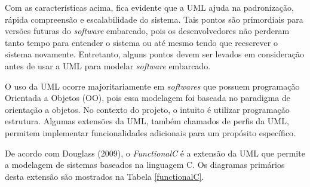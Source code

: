  
Com as características acima, fica evidente que a UML ajuda na padronização, rápida compreensão e escalabilidade do sistema. Tais pontos são primordiais para versões futuras do \textit{software} embarcado, pois os desenvolvedores não perderam tanto tempo para entender o sistema ou até mesmo tendo que reescrever o sistema novamente. Entretanto, alguns pontos devem ser levados em consideração antes de usar a UML para modelar \textit{software} embarcado.

	O uso da UML ocorre majoritariamente em \textit{softwares} que possuem programação Orientada a Objetos (OO), pois essa modelagem foi baseada no paradigma de orientação a objetos. No contexto do projeto, o intuito é utilizar programação estrutura. Algumas extensões da UML, também chamados de perfis da UML, permitem implementar funcionalidades adicionais para um propósito específico.
    
De acordo com Douglass (2009), o \textit{FunctionalC} é a extensão da UML que permite a modelagem de sistemas baseados na linguagem C. Os diagramas primários desta extensão são mostrados na Tabela \ref{functionalC}. 


